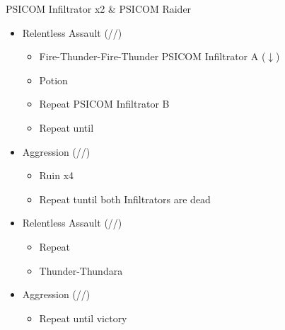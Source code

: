 \renewcommand{\fourth}{[4] Relentless Assault (\rav/\rav/\com)}
\renewcommand{\fifth}{[5] Aggression (\com/\rav/\com)}
\begin{battle}[0:42]{PSICOM Infiltrator x2 \& PSICOM Raider}
	\begin{itemize}
		\item \fourth
		      \begin{itemize}
			      \item Fire-Thunder-Fire-Thunder PSICOM Infiltrator A ($\downarrow$)
			      \item Potion
			      \item Repeat PSICOM Infiltrator B
			      \item Repeat until \stagger
		      \end{itemize}
		\item \fifth
		      \begin{itemize}
			      \item Ruin x4
			      \item Repeat tuntil both Infiltrators are dead
		      \end{itemize}
		\item \fourth
		      \begin{itemize}
			      \item Repeat
			      \item Thunder-Thundara
			            \stagger
		      \end{itemize}
		\item \fifth
		      \begin{itemize}
			      \item Repeat until victory
		      \end{itemize}
	\end{itemize}
	 
\end{battle}

\renewcommand{\first}{[1] Tide Turner (\syn/\sab)}
\renewcommand{\second}{[2] War and Peace (\com/\med)}
\renewcommand{\third}{[3] Slash \& Burn (\com/\rav)}
\renewcommand{\fourth}{[4] Dualcasting (\rav/\rav)}
\renewcommand{\fifth}{[5] Undermine (\rav/\sab)}
\renewcommand{\sixth}{[6] Divide \& Conquer (\com/\sab)}


